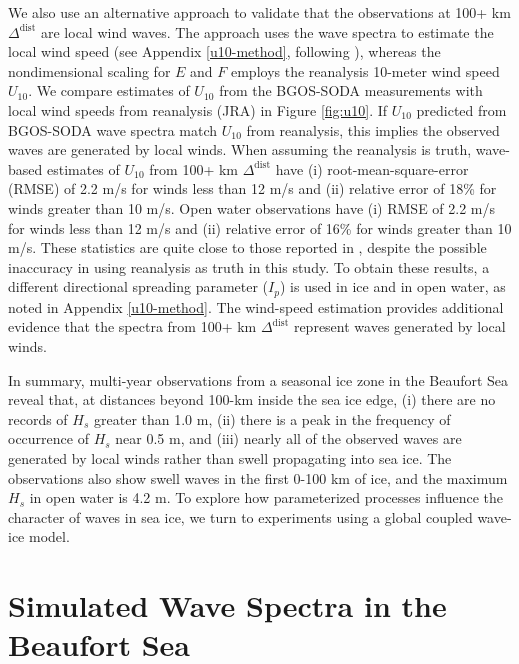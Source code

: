 \documentclass [11pt, proquest] {uwthesis}[2020/02/24]
\begin{document}
We also use an alternative approach to validate that the observations at 100+ km $\Delta^{ \mathrm{dist}}$ are local wind waves. The approach uses the wave spectra to estimate the local wind speed (see Appendix \ref{u10-method}, following \cite{Thomson2013WavesP, Voermans2020EstimatingSpectra}), whereas the nondimensional scaling for $E$ and $F$ employs the reanalysis 10-meter wind speed $U_{10}$. We compare estimates of $U_{10}$ from the BGOS-SODA measurements with local wind speeds from reanalysis (JRA) in Figure \ref{fig:u10}. If $U_{10}$ predicted from BGOS-SODA wave spectra match $U_{10}$ from reanalysis, this implies the observed waves are generated by local winds. When assuming the reanalysis is truth, wave-based estimates of $U_{10}$ from 100+ km $\Delta^{ \mathrm{dist}}$ have (i) root-mean-square-error (RMSE) of 2.2 m/s for winds less than 12 m/s and (ii) relative error of 18\% for winds greater than 10 m/s. Open water observations have (i) RMSE of 2.2 m/s for winds less than 12 m/s and (ii) relative error of 16\% for winds greater than 10 m/s. These statistics are quite close to those reported in \cite{Voermans2020EstimatingSpectra}, despite the possible inaccuracy in using reanalysis as truth in this study. To obtain these results, a different directional spreading parameter ($I_p$) is used in ice and in open water, as noted in Appendix \ref{u10-method}. The wind-speed estimation provides additional evidence that the spectra from 100+ km $\Delta^{ \mathrm{dist}}$ represent waves generated by local winds.

In summary, multi-year observations from a seasonal ice zone in the Beaufort Sea reveal that, at distances beyond 100-km inside the sea ice edge, (i) there are no records of $H_s$ greater than 1.0 m, (ii) there is a peak in the frequency of occurrence of $H_s$ near 0.5 m, and (iii) nearly all of the observed waves are generated by local winds rather than swell propagating into sea ice. The observations also show swell waves in the first 0-100 km of ice, and the maximum $H_s$ in open water is 4.2 m. To explore how parameterized processes influence the character of waves in sea ice, we turn to experiments using a global coupled wave-ice model.  

\section{Simulated Wave Spectra in the Beaufort Sea}
\label{model-results}
\end{document}
